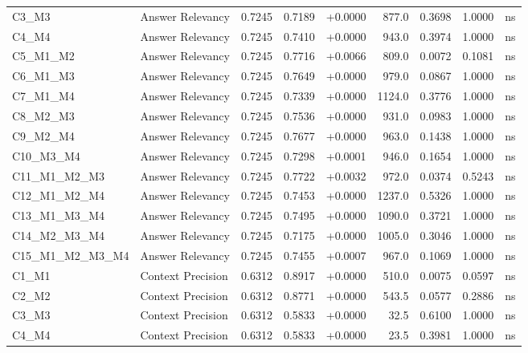\begin{table}[p]
\begin{tabular*}{\textwidth}{@{\extracolsep{\fill}} l l r r r r r r c @{}}
\addlinespace
C3\_M3          & Answer Relevancy     & 0.7245 & 0.7189 & +0.0000 & 877.0 & 0.3698 & 1.0000 & ns \\
\addlinespace
C4\_M4          & Answer Relevancy     & 0.7245 & 0.7410 & +0.0000 & 943.0 & 0.3974 & 1.0000 & ns \\
\addlinespace
C5\_M1\_M2      & Answer Relevancy     & 0.7245 & 0.7716 & +0.0066 & 809.0 & 0.0072 & 0.1081 & ns \\
\addlinespace
C6\_M1\_M3      & Answer Relevancy     & 0.7245 & 0.7649 & +0.0000 & 979.0 & 0.0867 & 1.0000 & ns \\
\addlinespace
C7\_M1\_M4      & Answer Relevancy     & 0.7245 & 0.7339 & +0.0000 & 1124.0 & 0.3776 & 1.0000 & ns \\
\addlinespace
C8\_M2\_M3      & Answer Relevancy     & 0.7245 & 0.7536 & +0.0000 & 931.0 & 0.0983 & 1.0000 & ns \\
\addlinespace
C9\_M2\_M4      & Answer Relevancy     & 0.7245 & 0.7677 & +0.0000 & 963.0 & 0.1438 & 1.0000 & ns \\
\addlinespace
C10\_M3\_M4     & Answer Relevancy     & 0.7245 & 0.7298 & +0.0001 & 946.0 & 0.1654 & 1.0000 & ns \\
\addlinespace
C11\_M1\_M2\_M3 & Answer Relevancy     & 0.7245 & 0.7722 & +0.0032 & 972.0 & 0.0374 & 0.5243 & ns \\
\addlinespace
C12\_M1\_M2\_M4 & Answer Relevancy     & 0.7245 & 0.7453 & +0.0000 & 1237.0 & 0.5326 & 1.0000 & ns \\
\addlinespace
C13\_M1\_M3\_M4 & Answer Relevancy     & 0.7245 & 0.7495 & +0.0000 & 1090.0 & 0.3721 & 1.0000 & ns \\
\addlinespace
C14\_M2\_M3\_M4 & Answer Relevancy     & 0.7245 & 0.7175 & +0.0000 & 1005.0 & 0.3046 & 1.0000 & ns \\
\addlinespace
C15\_M1\_M2\_M3\_M4 & Answer Relevancy     & 0.7245 & 0.7455 & +0.0007 & 967.0 & 0.1069 & 1.0000 & ns \\
\addlinespace
C1\_M1          & Context Precision    & 0.6312 & 0.8917 & +0.0000 & 510.0 & 0.0075 & 0.0597 & ns \\
\addlinespace
C2\_M2          & Context Precision    & 0.6312 & 0.8771 & +0.0000 & 543.5 & 0.0577 & 0.2886 & ns \\
\addlinespace
C3\_M3          & Context Precision    & 0.6312 & 0.5833 & +0.0000 & 32.5 & 0.6100 & 1.0000 & ns \\
\addlinespace
C4\_M4          & Context Precision    & 0.6312 & 0.5833 & +0.0000 & 23.5 & 0.3981 & 1.0000 & ns \\

\end{tabular*}
\end{table}
